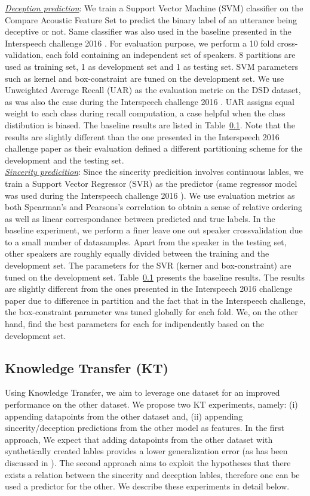 \documentclass{article}
\begin{document}
\noindent\underline{\it Deception prediction}: 
We train a Support Vector Machine (SVM) classifier on the Compare Acoustic Feature Set \cite{} to predict the binary label of an utterance being deceptive or not.
Same classifier was also used in the baseline presented in the Interspeech challenge 2016 \cite{}.
For evaluation purpose, we perform a 10 fold cross-validation, each fold containing an independent set of speakers.  
8 partitions are used as training set, 1 as development set and 1 as testing set.
SVM parameters such as kernel and box-constraint are tuned on the development set.
We use Unweighted Average Recall (UAR) as the evaluation metric on the DSD dataset, as was also the case during the Interspeech challenge 2016 \cite{}.
UAR assigns equal weight to each class during recall computation, a case helpful when the class distibution is biased. 
The baseline results are listed in Table~\ref{}.
Note that the results are slightly different than the one presented in the Interspeech 2016 challenge paper \cite{} as their evaluation defined a different partitioning scheme for the development and the testing set.
\\

\noindent\underline{\it Sincerity predicition}:
Since the sincerity predicition involves continuous lables, we train a Support Vector Regressor (SVR) as the predictor (same regressor model was used during the Interspeech challenge 2016 \cite{}).
We use evaluation metrics as both Spearman's and Pearsons's correlation to obtain a sense of relative ordering as well as linear correspondance between predicted and true labels. 
In the baseline experiment, we perform a finer leave one out speaker crossvalidation due to a small number of datasamples.
Apart from the speaker in the testing set, other speakers are roughly equally divided between the training and the development set.
The parameters for the SVR (kerner and box-constraint) are tuned on the development set. 
Table~\ref{} presents the baseline results.
The results are slightly different from the ones presented in the Interspeech 2016 challenge paper \cite{} due to difference in partition and the fact that in the Interspeech challenge, the box-constraint parameter was tuned globally for each fold.
We, on the other hand, find the best parameters for each for indipendently based on the development set. 

\subsection{Knowledge Transfer (KT)}
Using Knowledge Transfer, we aim to leverage one dataset for an improved performance on the other dataset.
We propose two KT experiments, namely: (i) appending datapoints from the other dataset and, (ii) appending sincerity/deception predictions from the other model as features.
In the first approach, We expect that adding datapoints from the other dataset with synthetically created lables provides a lower generalization error (as has been discussed in \cite{}). 
The second approach aims to exploit the hypotheses that there exists a relation between the sincerity and deception lables, therefore one can be used a predictor for the other.
We describe these experiments in detail below. 
\end{document}
